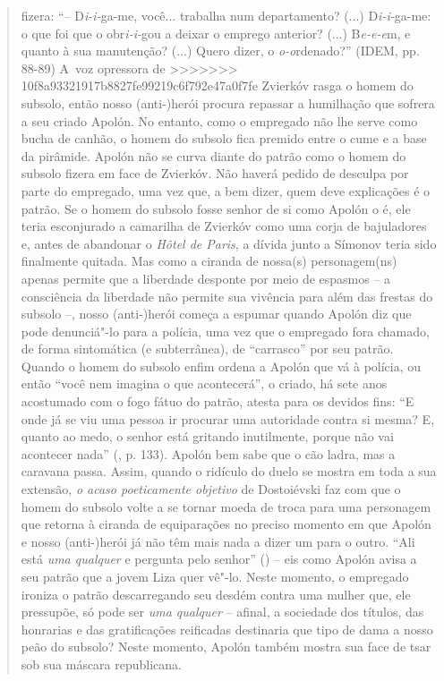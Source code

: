 {\begin{quote}
fizera: ``-- D\emph{i-i-}ga-me, você... trabalha num departamento? (...)
D\emph{i-i-}ga-me: o que foi que o obr\emph{i-i-}gou a deixar o emprego
anterior? (...) B\emph{e-e-e}m, e quanto à sua manutenção? (...) Quero
dizer, o \emph{o-o}rdenado?'' (IDEM, pp. 88-89) A~voz opressora de
>>>>>>> 10f8a93321917b8827fe99219c6f792e47a0f7fe
Zvierkóv rasga o homem do subsolo, então nosso (anti-)herói procura
repassar a humilhação que sofrera a seu criado Apolón. No entanto, como
o empregado não lhe serve como bucha de canhão, o homem do subsolo fica
premido entre o cume e a base da pirâmide. Apolón não se curva diante do
patrão como o homem do subsolo fizera em face de Zvierkóv. Não haverá
pedido de desculpa por parte do empregado, uma vez que, a bem dizer,
quem deve explicações é o patrão. Se o homem do subsolo fosse senhor de
si como Apolón o é, ele teria esconjurado a camarilha de Zvierkóv como
uma corja de bajuladores e, antes de abandonar o \emph{Hôtel de Paris},
a dívida junto a Símonov teria sido finalmente quitada. Mas como a
ciranda de nossa(s) personagem(ns) apenas permite que a liberdade
desponte por meio de espasmos -- a consciência da liberdade não permite
sua vivência para além das frestas do subsolo --, nosso (anti-)herói
começa a espumar quando Apolón diz que pode denunciá"-lo para a polícia,
uma vez que o empregado fora chamado, de forma sintomática (e
subterrânea), de ``carrasco'' por seu patrão. Quando o homem do subsolo
enfim ordena a Apolón que vá à polícia, ou então ``você nem imagina o
que acontecerá'', o criado, há sete anos acostumado com o fogo fátuo do
patrão, atesta para os devidos fins: ``E onde já se viu uma pessoa ir
procurar uma autoridade contra si mesma? E, quanto ao medo, o senhor
está gritando inutilmente, porque não vai acontecer nada'' (, p.
133). Apolón bem sabe que o cão ladra, mas a caravana passa. Assim,
quando o ridículo do duelo se mostra em toda a sua extensão, \emph{o
acaso poeticamente objetivo} de Dostoiévski faz com que o homem do
subsolo volte a se tornar moeda de troca para uma personagem que retorna
à ciranda de equiparações no preciso momento em que Apolón e nosso
(anti-)herói já não têm mais nada a dizer um para o outro. ``Ali está
\emph{uma qualquer} e pergunta pelo senhor'' () -- eis como Apolón
avisa a seu patrão que a jovem Liza quer vê"-lo. Neste momento, o
empregado ironiza o patrão descarregando seu desdém contra uma mulher
que, ele pressupõe, só pode ser \emph{uma qualquer} -- afinal, a
sociedade dos títulos, das honrarias e das gratificações reificadas
destinaria que tipo de dama a nosso peão do subsolo? Neste momento,
Apolón também mostra sua face de tsar sob sua máscara republicana.


\end{quote}}
